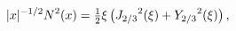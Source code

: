\[|x|^{-1/2}{\mathop{N\/}\nolimits^{2}}\!\left(x\right)=\tfrac{1}{2}\xi\left({%
\mathop{J_{2/3}\/}\nolimits^{2}}\!\left(\xi\right)+{\mathop{Y_{2/3}\/}%
\nolimits^{2}}\!\left(\xi\right)\right),\]
